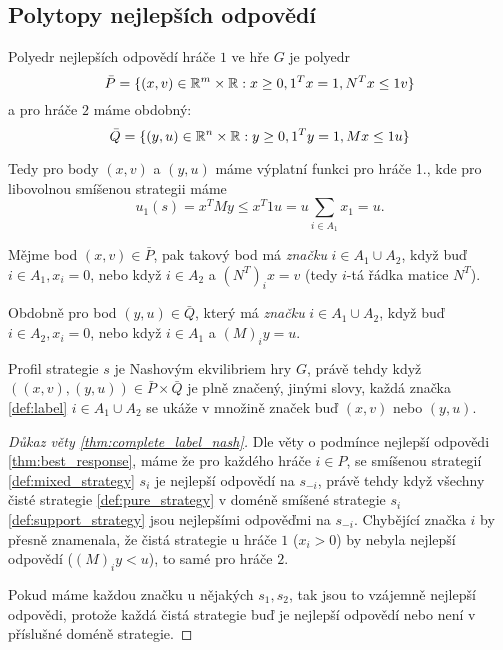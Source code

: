 \subsection{Polytopy nejlepších odpovědí}
\begin{definition} 
\label{def:best_response_polyhedrom}
Polyedr nejlepších odpovědí hráče $1$ ve hře $G$ je polyedr 
$$
\bar{P} = \{(x,v)\in \mathbb{R}^m \times \mathbb{R}: x \geq 0, 1^Tx = 1, N^Tx \leq 1v\}
$$ 
a pro hráče $2$ máme obdobný:
$$
\bar{Q} = \{(y,u)\in \mathbb{R}^n \times \mathbb{R}: y \geq 0, 1^Ty = 1, Mx \leq 1u\}
$$
\end{definition}
Tedy pro body $(x,v)$ a $(y,u)$ máme výplatní funkci pro hráče 1., kde pro libovolnou smíšenou strategii máme 
$$ 
u_1(s) = x^T M y \leq x^T1u = u \sum_{i \in A_1} x_1 = u. 
$$ 
\begin{definition}[Značka]
\label{def:label}
Mějme bod $(x,v) \in \bar{P}$, pak takový bod má \textit{značku} $i \in A_1 \cup A_2$, když buď $i \in A_1, x_i = 0$, nebo když $i \in A_2$ a $(N^T)_i x = v$ (tedy $i$-tá řádka matice $N^T$). 

Obdobně pro bod $(y,u) \in \bar{Q}$, který má \textit{značku} $i \in A_1 \cup A_2$, když buď $i \in A_2, x_i = 0$, nebo když $i \in A_1$ a $(M)_i y = u$. 
\end{definition}
\begin{theorem}
\label{thm:complete_label_nash}
Profil strategie $s$ je Nashovým ekvilibriem hry $G$, právě tehdy když $((x,v), (y,u))\in \bar{P} \times \bar{Q}$ je plně značený, jinými slovy, každá značka \ref{def:label} $i \in A_1 \cup A_2$ se ukáže v množině značek buď $(x,v)$ nebo $(y,u)$.
\end{theorem}
\begin{proof}[Důkaz věty \ref{thm:complete_label_nash}]
    Dle věty o podmínce nejlepší odpovědi \ref{thm:best_response}, máme že pro každého hráče $i \in P$, se smíšenou strategií \ref{def:mixed_strategy} $s_i$ je nejlepší odpovědí na $s_{-i}$, právě tehdy když všechny čisté strategie \ref{def:pure_strategy} v doméně smíšené strategie $s_i$ \ref{def:support_strategy} jsou nejlepšími odpověďmi na $s_{-i}$. 
    Chybějící značka $i$ by přesně znamenala, že čistá strategie u hráče $1$ ($x_i >0$) by nebyla nejlepší odpovědí ($(M)_i y < u$), to samé pro hráče $2$. 

    Pokud máme každou značku u nějakých $s_1, s_2$, tak jsou to vzájemně nejlepší odpovědi, protože každá čistá strategie buď je nejlepší odpovědí nebo není v příslušné doméně strategie.
\end{proof}

